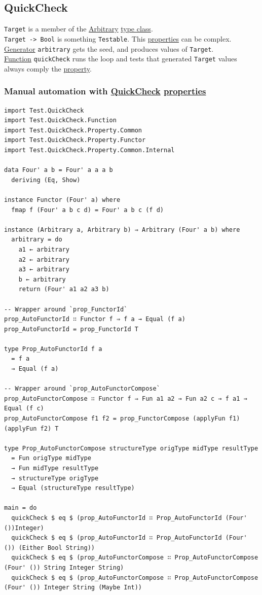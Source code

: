 \documentclass[a4paper,14pt,oneside]{book}
\begin{document}
\subsection{\label{org6a11f84}QuickCheck}
\label{sec:org47a878a}
\texttt{Target} is a member of the \hyperref[org43edc2a]{Arbitrary} \hyperref[org8e22081]{type class}.\\
\texttt{Target -> Bool} is something \texttt{Testable}. This \hyperref[orge2c24e7]{properties} can be complex.\\
\hyperref[orgc2df65b]{Generator} \texttt{arbitrary} gets the seed, and produces values of \texttt{Target}.\\
\hyperref[org39271b2]{Function} \texttt{quickCheck} runs the loop and tests that generated \texttt{Target} values always comply the \hyperref[org217f324]{property}.\\

\subsubsection{Manual automation with \hyperref[org6a11f84]{QuickCheck} \hyperref[orge2c24e7]{properties}}
\label{sec:orgb3d863c}

\begin{verbatim}
import Test.QuickCheck
import Test.QuickCheck.Function
import Test.QuickCheck.Property.Common
import Test.QuickCheck.Property.Functor
import Test.QuickCheck.Property.Common.Internal

data Four' a b = Four' a a a b
  deriving (Eq, Show)

instance Functor (Four' a) where
  fmap f (Four' a b c d) = Four' a b c (f d)

instance (Arbitrary a, Arbitrary b) ⇒ Arbitrary (Four' a b) where
  arbitrary = do
    a1 ← arbitrary
    a2 ← arbitrary
    a3 ← arbitrary
    b ← arbitrary
    return (Four' a1 a2 a3 b)

-- Wrapper around `prop_FunctorId`
prop_AutoFunctorId ∷ Functor f ⇒ f a → Equal (f a)
prop_AutoFunctorId = prop_FunctorId T

type Prop_AutoFunctorId f a
  = f a
  → Equal (f a)

-- Wrapper around `prop_AutoFunctorCompose`
prop_AutoFunctorCompose ∷ Functor f ⇒ Fun a1 a2 → Fun a2 c → f a1 → Equal (f c)
prop_AutoFunctorCompose f1 f2 = prop_FunctorCompose (applyFun f1) (applyFun f2) T

type Prop_AutoFunctorCompose structureType origType midType resultType
  = Fun origType midType
  → Fun midType resultType
  → structureType origType
  → Equal (structureType resultType)

main = do
  quickCheck $ eq $ (prop_AutoFunctorId ∷ Prop_AutoFunctorId (Four' ())Integer)
  quickCheck $ eq $ (prop_AutoFunctorId ∷ Prop_AutoFunctorId (Four' ()) (Either Bool String))
  quickCheck $ eq $ (prop_AutoFunctorCompose ∷ Prop_AutoFunctorCompose (Four' ()) String Integer String)
  quickCheck $ eq $ (prop_AutoFunctorCompose ∷ Prop_AutoFunctorCompose (Four' ()) Integer String (Maybe Int))
\end{verbatim}
\end{document}
